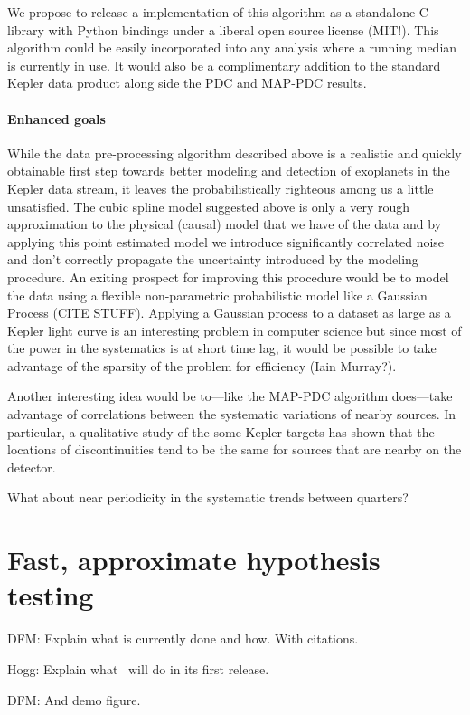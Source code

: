 \documentclass[letterpaper,12pt,preprint]{hack_aastex}
\newcommand{\Turnstile}{\package{IronHorse}}
\begin{document}
We propose to release a implementation of this algorithm as a standalone C
library with Python bindings under a liberal open source license (MIT!).
This algorithm could be easily incorporated into any analysis where a running
median is currently in use.
It would also be a complimentary addition to the standard Kepler data
product along side the PDC and MAP-PDC results.


\paragraph{Enhanced goals}
While the data pre-processing algorithm described above is a realistic and
quickly obtainable first step towards better modeling and detection of
exoplanets in the Kepler data stream, it leaves the probabilistically
righteous among us a little unsatisfied.
The cubic spline model suggested above is only a very rough approximation to
the physical (causal) model that we have of the data and by applying this
point estimated model we introduce significantly correlated noise and don't
correctly propagate the uncertainty introduced by the modeling procedure.
An exiting prospect for improving this procedure would be to model the data
using a flexible non-parametric probabilistic model like a Gaussian Process
 (CITE STUFF).
Applying a Gaussian process to a dataset as large as a Kepler light curve is
an interesting problem in computer science but since most of the power in the
systematics is at short time lag, it would be possible to take advantage of
the sparsity of the problem for efficiency (Iain Murray?).

Another interesting idea would be to---like the MAP-PDC algorithm does---take
advantage of correlations between the systematic variations of nearby sources.
In particular, a qualitative study of the some Kepler targets has shown that
the locations of discontinuities tend to be the same for sources that are
nearby on the detector.

What about near periodicity in the systematic trends between quarters?

\section{Fast, approximate hypothesis testing}

DFM:  Explain what is currently done and how.  With citations.

Hogg:  Explain what \Turnstile\ will do in its first release.

DFM:  And demo figure.
\end{document}
